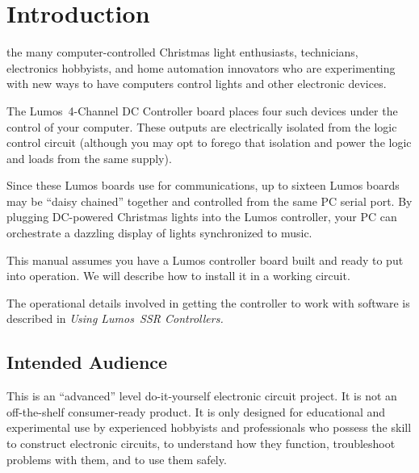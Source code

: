 \documentclass[letterpaper,twoside,onecolumn,openright,final]{memoir}
\begin{document}
\begin{center}
\end{center}

\newpage
\tableofcontents
\listoffigures

\mainmatter

\chapter{Introduction}
 the many computer-controlled
Christmas light enthusiasts,  technicians, electronics hobbyists,
and home automation innovators who are experimenting with new ways to have computers
control lights and other electronic devices.

The Lumos\TM\ 4-Channel DC Controller board places four such devices under the control
of your computer.  These outputs are 
electrically isolated from the logic control circuit (although you may opt to forego that
isolation and power the logic and loads from the same supply).

Since these Lumos boards use  for communications, up to sixteen Lumos
boards may be ``daisy chained'' together and controlled from 
the same PC serial port.
By plugging DC-powered Christmas lights into the Lumos controller, your PC can orchestrate
a dazzling display of lights synchronized to music.

This manual assumes you have a Lumos controller board built and ready to put into operation.
We will describe how to install it in a working circuit.  

The operational details involved
in getting the controller to work with software is described in 
\emph{Using Lumos\TM\ SSR Controllers.}

\section{Intended Audience}
This is an ``advanced'' level do-it-yourself electronic circuit project.  It is not
an off-the-shelf consumer-ready product.  It is only designed for educational and experimental
use by experienced hobbyists and professionals who possess the skill to construct electronic
circuits, to understand how they function, troubleshoot problems with them, and to use them safely.



\end{document}
